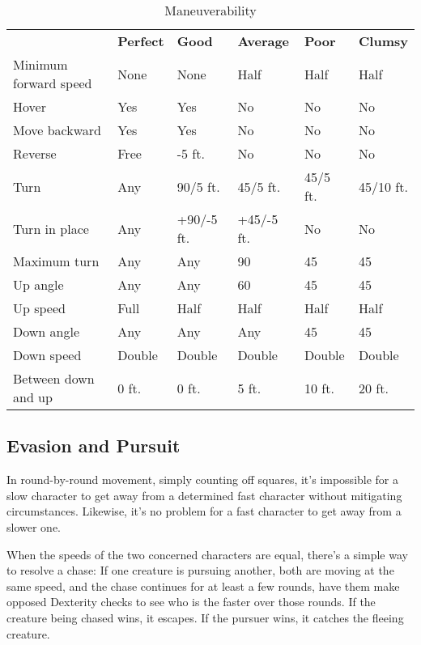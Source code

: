 \begin{table}[htb]
\caption{Maneuverability}
\centering
\begin{tabular}{*{6}{l}}
 & \textbf{Perfect} & \textbf{Good} & \textbf{Average} & \textbf{Poor} & \textbf{Clumsy}\\
Minimum forward speed & None & None & Half & Half & Half\\
Hover & Yes & Yes & No & No & No\\
Move backward & Yes & Yes & No & No & No\\
Reverse & Free & -5 ft. & No & No & No\\
Turn & Any & 90\textdegree{}/5 ft. & 45\textdegree{}/5 ft. & 45\textdegree{}/5 ft. & 45\textdegree{}/10 ft.\\
Turn in place & Any & +90\textdegree{}/-5 ft. & +45\textdegree{}/-5 ft. & No & No\\
Maximum turn & Any & Any & 90\textdegree{} & 45\textdegree{} & 45\textdegree{}\\
Up angle & Any & Any & 60\textdegree{} & 45\textdegree{} & 45\textdegree{}\\
Up speed & Full & Half & Half & Half & Half\\
Down angle & Any & Any & Any & 45\textdegree{} & 45\textdegree{}\\
Down speed & Double & Double & Double & Double & Double\\
Between down and up & 0 ft. & 0 ft. & 5 ft. & 10 ft. & 20 ft.\\
\end{tabular}
\end{table}

\subsection{Evasion and Pursuit}

In round-by-round movement, simply counting off squares, it's impossible for a 
slow character to get away from a determined fast character without mitigating 
circumstances. Likewise, it's no problem for a fast character to get away from 
a slower one. 

When the speeds of the two concerned characters are equal, there's a simple way 
to resolve a chase: If one creature is pursuing another, both are moving at the 
same speed, and the chase continues for at least a few rounds, have them make opposed 
Dexterity checks to see who is the faster over those rounds. If the creature being 
chased wins, it escapes. If the pursuer wins, it catches the fleeing creature. 

